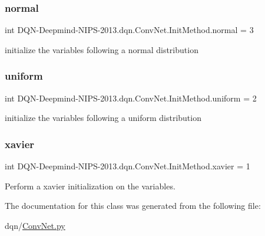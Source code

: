 \subsubsection{\texorpdfstring{normal}{normal}}
{\footnotesize\ttfamily int D\+QN-\/Deepmind-\/N\+I\+PS-\/2013.dqn.\+Conv\+Net.\+Init\+Method.\+normal = 3\hspace{0.3cm}{\ttfamily [static]}}



initialize the variables following a normal distribution 

\hypertarget{classDQN-Deepmind-NIPS-2013_1_1dqn_1_1ConvNet_1_1InitMethod_ac26aff95fc96a42c00df1ef7cd7c7282}{}\label{classDQN-Deepmind-NIPS-2013_1_1dqn_1_1ConvNet_1_1InitMethod_ac26aff95fc96a42c00df1ef7cd7c7282} 
\subsubsection{\texorpdfstring{uniform}{uniform}}
{\footnotesize\ttfamily int D\+QN-\/Deepmind-\/N\+I\+PS-\/2013.dqn.\+Conv\+Net.\+Init\+Method.\+uniform = 2\hspace{0.3cm}{\ttfamily [static]}}



initialize the variables following a uniform distribution 

\hypertarget{classDQN-Deepmind-NIPS-2013_1_1dqn_1_1ConvNet_1_1InitMethod_a40f9ca5144076077f6c2a28ca6983c1d}{}\label{classDQN-Deepmind-NIPS-2013_1_1dqn_1_1ConvNet_1_1InitMethod_a40f9ca5144076077f6c2a28ca6983c1d} 
\subsubsection{\texorpdfstring{xavier}{xavier}}
{\footnotesize\ttfamily int D\+QN-\/Deepmind-\/N\+I\+PS-\/2013.dqn.\+Conv\+Net.\+Init\+Method.\+xavier = 1\hspace{0.3cm}{\ttfamily [static]}}



Perform a xavier initialization on the variables. 



The documentation for this class was generated from the following file\+:\begin{DoxyCompactItemize}
\item 
dqn/\hyperlink{ConvNet_8py}{Conv\+Net.\+py}\end{DoxyCompactItemize}
